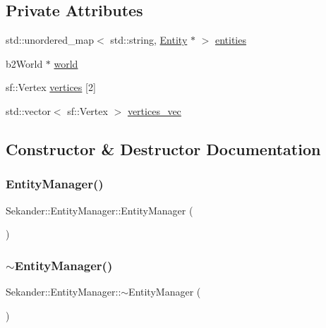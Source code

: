 \subsection*{Private Attributes}
\begin{DoxyCompactItemize}
\item 
std\+::unordered\+\_\+map$<$ std\+::string, \hyperlink{classSekander_1_1Entity}{Entity} $\ast$ $>$ \hyperlink{classSekander_1_1EntityManager_a8ee9d64c41a23790dc4c1e3f1ce3ea56}{entities}
\item 
b2\+World $\ast$ \hyperlink{classSekander_1_1EntityManager_ad2d38ab329ff4b57b2d66b807dacdbb3}{world}
\item 
sf\+::\+Vertex \hyperlink{classSekander_1_1EntityManager_af00445583df085f6c28390b4b940ccc5}{vertices} \mbox{[}2\mbox{]}
\item 
std\+::vector$<$ sf\+::\+Vertex $>$ \hyperlink{classSekander_1_1EntityManager_a40f45e16f17a739a730c1373021e5cc9}{vertices\+\_\+vec}
\end{DoxyCompactItemize}


\subsection{Constructor \& Destructor Documentation}
\mbox{\label{classSekander_1_1EntityManager_a98a085b51de53396a9a9b7803422c6ff}} 
\subsubsection{\texorpdfstring{Entity\+Manager()}{EntityManager()}}
{\footnotesize\ttfamily Sekander\+::\+Entity\+Manager\+::\+Entity\+Manager (\begin{DoxyParamCaption}{ }\end{DoxyParamCaption})}

\mbox{\label{classSekander_1_1EntityManager_adcd3f85835de9ac2eb2af3c876899244}} 
\subsubsection{\texorpdfstring{$\sim$\+Entity\+Manager()}{~EntityManager()}}
{\footnotesize\ttfamily Sekander\+::\+Entity\+Manager\+::$\sim$\+Entity\+Manager (\begin{DoxyParamCaption}{ }\end{DoxyParamCaption})}



